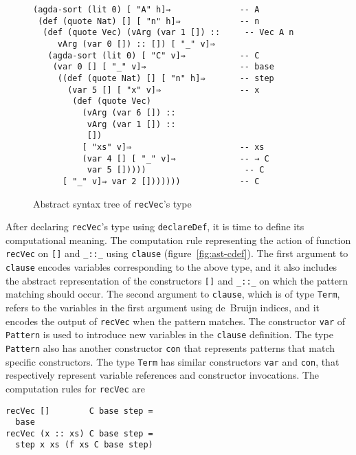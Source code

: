 \documentclass[sigplan,10pt]{acmart}
\begin{document}
\begin{figure}
\begin{center}
\begingroup
\fontsize{9pt}{10pt}\selectfont
\begin{Verbatim}
(agda-sort (lit 0) [ "A" h]⇒              -- A
 (def (quote Nat) [] [ "n" h]⇒            -- n
  (def (quote Vec) (vArg (var 1 []) ::     -- Vec A n
     vArg (var 0 []) :: []) [ "_" v]⇒
   (agda-sort (lit 0) [ "C" v]⇒           -- C
    (var 0 [] [ "_" v]⇒                   -- base
     ((def (quote Nat) [] [ "n" h]⇒       -- step
       (var 5 [] [ "x" v]⇒                -- x
        (def (quote Vec)
          (vArg (var 6 []) ::         
           vArg (var 1 []) ::
           [])
          [ "xs" v]⇒                      -- xs
          (var 4 [] [ "_" v]⇒             -- → C
           var 5 []))))                    -- C
      [ "_" v]⇒ var 2 []))))))            -- C
\end{Verbatim}
\endgroup
\end{center}
\caption{Abstract syntax tree of \texttt{recVec}'s type}
\label{fig:ast-d}
\end{figure}
\normalsize


After declaring \texttt{recVec}'s type using {\tt declareDef}, it is time to define its computational meaning.
The computation rule representing the action of function \texttt{recVec} on {\tt []} and {\tt \_::\_} using {\tt clause} (figure~\ref{fig:ast-cdef}). The first argument to {\tt clause} encodes variables corresponding to the above type, and it also includes the abstract representation of the constructors {\tt []} and {\tt \_::\_} on which the pattern matching should occur. The second argument to \texttt{clause}, which is of type {\tt Term}, refers to the variables in the first argument using de~Bruijn indices, and it encodes the output of \texttt{recVec} when the pattern matches.
The constructor {\tt var} of {\tt Pattern} is used to introduce new variables in the {\tt clause} definition. The type {\tt Pattern} also has another constructor {\tt con} that represents patterns that match specific constructors.
The type {\tt Term} has similar constructors {\tt var} and {\tt con}, that respectively represent variable references and constructor invocations.
The computation rules for \texttt{recVec} are
\begin{Verbatim}
recVec []        C base step =
  base
recVec (x :: xs) C base step =
  step x xs (f xs C base step)
\end{Verbatim}
\end{document}
